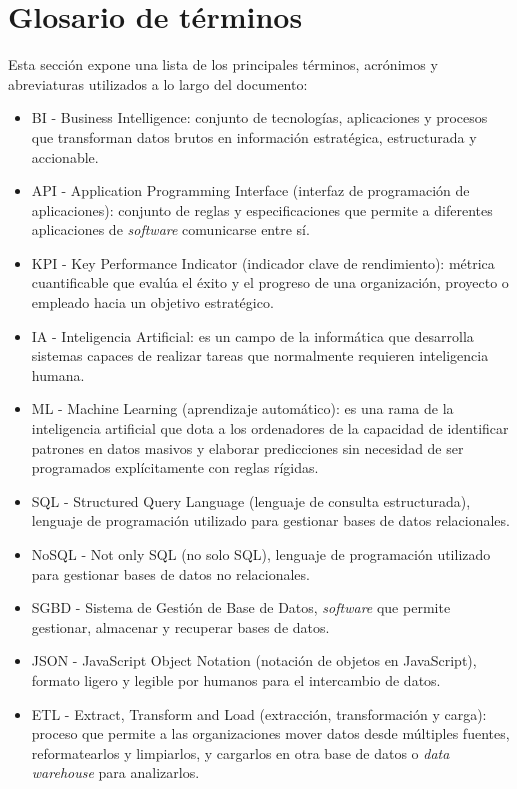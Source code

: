 \section{Glosario de términos} 
Esta sección expone una lista de los principales términos, acrónimos y abreviaturas utilizados a lo largo del documento:
\begin{itemize}
    \item BI - Business Intelligence:  conjunto de tecnologías, aplicaciones y procesos que transforman datos brutos en información estratégica, estructurada y accionable.
    \item API - Application Programming Interface (interfaz de programación de aplicaciones): conjunto de reglas y especificaciones que permite a diferentes aplicaciones de \textit{software} comunicarse entre sí.
    \item KPI - Key Performance Indicator (indicador clave de rendimiento): métrica cuantificable que evalúa el éxito y el progreso de una organización, proyecto o empleado hacia un objetivo estratégico.
    \item IA - Inteligencia Artificial: es un campo de la informática que desarrolla sistemas capaces de realizar tareas que normalmente requieren inteligencia humana.
    \item ML - Machine Learning (aprendizaje automático): es una rama de la inteligencia artificial que dota a los ordenadores de la capacidad de identificar patrones en datos masivos y elaborar predicciones sin necesidad de ser programados explícitamente con reglas rígidas.
    \item SQL - Structured Query Language (lenguaje de consulta estructurada), lenguaje de programación utilizado para gestionar bases de datos relacionales.
    \item NoSQL - Not only SQL (no solo SQL), lenguaje de programación utilizado para gestionar bases de datos no relacionales.
    \item SGBD - Sistema de Gestión de Base de Datos, \textit{software} que permite gestionar, almacenar y recuperar bases de datos.
    \item JSON - JavaScript Object Notation (notación de objetos en JavaScript), formato ligero y legible por humanos para el intercambio de datos.
    \item ETL - Extract, Transform and Load (extracción, transformación y carga): proceso que permite a las organizaciones mover datos desde múltiples fuentes, reformatearlos y limpiarlos, y cargarlos en otra base de datos  o \textit{data warehouse} para analizarlos.

\end{itemize}
